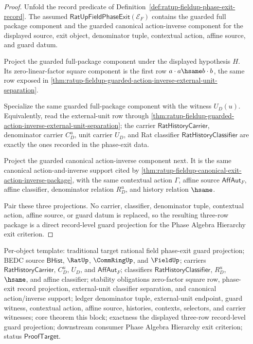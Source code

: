 \begin{proof}
Unfold the record predicate of
Definition~\ref{def:ratup-fieldup-phase-exit-record}. The assumed
$\mathsf{RatUpFieldPhaseExit}(\mathcal E_F)$ contains the guarded full package
component and the guarded canonical action-inverse component for the displayed
source, exit object, denominator tuple, contextual action, affine source, and
guard datum.

Project the guarded full-package component under the displayed hypothesis $H$.
Its zero-linear-factor square component is the first row
$a\cdot a\hsame b\cdot b$, the same row exposed in
\autoref{thm:ratup-fieldup-guarded-action-inverse-external-unit-separation}.

Specialize the same guarded full-package component with the witness $U_D(u)$.
Equivalently, read the external-unit row through
\autoref{thm:ratup-fieldup-guarded-action-inverse-external-unit-separation};
the carrier $\mathsf{RatHistoryCarrier}$, denominator carrier $C_D^u$, unit
carrier $U_D$, and Rat classifier $\mathsf{RatHistoryClassifier}$ are exactly
the ones recorded in the phase-exit data.

Project the guarded canonical action-inverse component next. It is the same
canonical action-and-inverse support cited by
\autoref{thm:ratup-fieldup-canonical-exit-action-inverse-package}, with the
same contextual action $\Gamma$, affine source $\mathsf{AffAut}_F$, affine
classifier, denominator relation $R_D^u$, and history relation $\hsame$.

Pair these three projections. No carrier, classifier, denominator tuple,
contextual action, affine source, or guard datum is replaced, so the resulting
three-row package is a direct record-level guard projection for the Phase Algebra
Hierarchy exit criterion.
\end{proof}

Per-object template: traditional target rational field phase-exit guard
projection; BEDC source $\mathsf{BHist}$, $\RatUp$, $\CommRingUp$, and
$\FieldUp$; carriers $\mathsf{RatHistoryCarrier}$, $C_D^u$, $U_D$, and
$\mathsf{AffAut}_F$; classifiers $\mathsf{RatHistoryClassifier}$, $R_D^u$,
$\hsame$, and affine classifier; stability obligations zero-factor square row,
phase-exit record projection, external-unit classifier separation, and
canonical action/inverse support; ledger denominator tuple, external-unit
endpoint, guard witness, contextual action, affine source, histories, contexts,
selectors, and carrier witnesses; core theorem this block; exactness the
displayed three-row record-level guard projection; downstream consumer Phase
Algebra Hierarchy exit criterion; status $\mathsf{ProofTarget}$.
